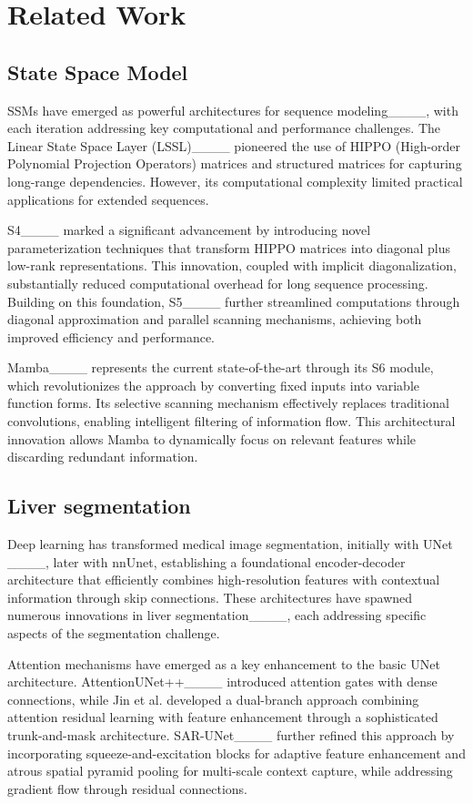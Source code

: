 \section{Related Work}
\subsection{State Space Model}
SSMs have emerged as powerful architectures for sequence modeling____, with each iteration addressing key computational and performance challenges. The Linear State Space Layer (LSSL)____ pioneered the use of HIPPO (High-order Polynomial Projection Operators) matrices and structured matrices for capturing long-range dependencies. However, its computational complexity limited practical applications for extended sequences.

S4____ marked a significant advancement by introducing novel parameterization techniques that transform HIPPO matrices into diagonal plus low-rank representations. This innovation, coupled with implicit diagonalization, substantially reduced computational overhead for long sequence processing. Building on this foundation, S5____ further streamlined computations through diagonal approximation and parallel scanning mechanisms, achieving both improved efficiency and performance.

Mamba____ represents the current state-of-the-art through its S6 module, which revolutionizes the approach by converting fixed inputs into variable function forms. Its selective scanning mechanism effectively replaces traditional convolutions, enabling intelligent filtering of information flow. This architectural innovation allows Mamba to dynamically focus on relevant features while discarding redundant information.

\subsection{Liver segmentation}
Deep learning has transformed medical image segmentation, initially with UNet ____, later with nnUnet, establishing a foundational encoder-decoder architecture that efficiently combines high-resolution features with contextual information through skip connections. These architectures have spawned numerous innovations in liver segmentation____, each addressing specific aspects of the segmentation challenge.

Attention mechanisms have emerged as a key enhancement to the basic UNet architecture. AttentionUNet++____ introduced attention gates with dense connections, while Jin et al. developed a dual-branch approach combining attention residual learning with feature enhancement through a sophisticated trunk-and-mask architecture. SAR-UNet____ further refined this approach by incorporating squeeze-and-excitation blocks for adaptive feature enhancement and atrous spatial pyramid pooling for multi-scale context capture, while addressing gradient flow through residual connections.

